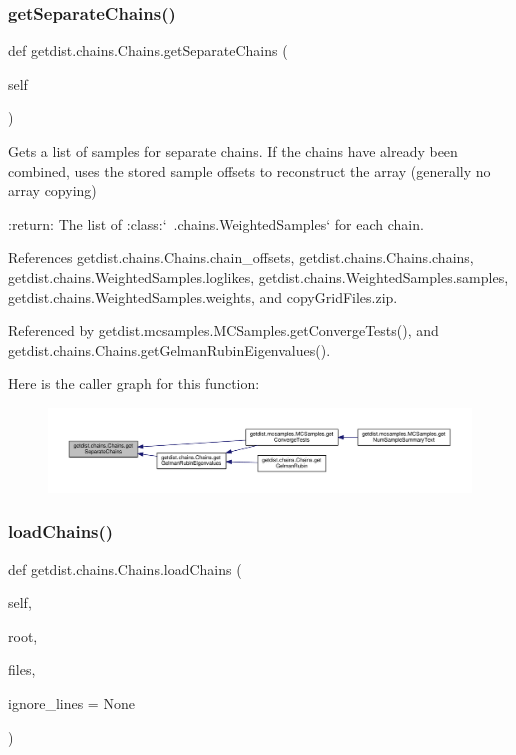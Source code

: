 \subsubsection{\texorpdfstring{get\+Separate\+Chains()}{getSeparateChains()}}
{\footnotesize\ttfamily def getdist.\+chains.\+Chains.\+get\+Separate\+Chains (\begin{DoxyParamCaption}\item[{}]{self }\end{DoxyParamCaption})}

\begin{DoxyVerb}Gets a list of samples for separate chains. 
If the chains have already been combined, uses the stored sample offsets to reconstruct the array (generally no array copying)

:return: The list of :class:`~.chains.WeightedSamples` for each chain. 
\end{DoxyVerb}
 

References getdist.\+chains.\+Chains.\+chain\+\_\+offsets, getdist.\+chains.\+Chains.\+chains, getdist.\+chains.\+Weighted\+Samples.\+loglikes, getdist.\+chains.\+Weighted\+Samples.\+samples, getdist.\+chains.\+Weighted\+Samples.\+weights, and copy\+Grid\+Files.\+zip.



Referenced by getdist.\+mcsamples.\+M\+C\+Samples.\+get\+Converge\+Tests(), and getdist.\+chains.\+Chains.\+get\+Gelman\+Rubin\+Eigenvalues().

Here is the caller graph for this function\+:
\nopagebreak
\begin{figure}[H]
\begin{center}
\leavevmode
\includegraphics[width=350pt]{classgetdist_1_1chains_1_1Chains_a16d3828d299dda03e7ab074ae755e3fc_icgraph}
\end{center}
\end{figure}
\mbox{\label{classgetdist_1_1chains_1_1Chains_afd750faaaf604587c4a978a4d5aa17a1}} 
\subsubsection{\texorpdfstring{load\+Chains()}{loadChains()}}
{\footnotesize\ttfamily def getdist.\+chains.\+Chains.\+load\+Chains (\begin{DoxyParamCaption}\item[{}]{self,  }\item[{}]{root,  }\item[{}]{files,  }\item[{}]{ignore\+\_\+lines = {\ttfamily None} }\end{DoxyParamCaption})}

